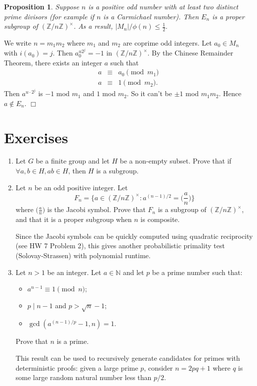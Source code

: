 \documentclass{article}
\def\Z{{\mathbb Z}}
\def\N{{\mathbb N}}
\def\Z{{\mathbb Z}}
\newtheorem{proposition}[subsection]{Proposition}
\newenvironment{proof}{\noindent {\bf Proof:}}{$\Box$ \vspace{2 ex}}
\renewcommand{\lg}[2]{\Big(\frac{#1}{#2}\Big)}
\begin{document}
\begin{proposition}
    Suppose $n$ is a positive odd number with at least two distinct prime divisors (for example if $n$ is a Carmichael number). Then $E_n$ is a proper subgroup of $(\Z/n\Z)^\times$. As a result, $|M_n|/\phi(n) \leq\frac12.$
\end{proposition}

\begin{proof}
    We write $n = m_1m_2$ where $m_1$ and $m_2$ are coprime odd integers. Let $a_0\in M_n$ with $i(a_0) = j$. Then $a_0^{u2^j} = -1$ in $(\Z/n\Z)^\times$. By the Chinese Remainder Theorem, there exists an integer $a$ such that \begin{eqnarray*}
        a&\equiv& a_0\pmod{m_1}\\
        a&\equiv&1\pmod{m_2}.
    \end{eqnarray*}
    Then $a^{u\cdot2^j}$ is $-1$ mod $m_1$ and $1$ mod $m_2$. So it can't be $\pm1$ mod $m_1m_2$. Hence $a\notin E_n$.
\end{proof}

\section*{Exercises}
\begin{enumerate}
    \item Let $G$ be a finite group and let $H$ be a non-empty subset. Prove that if $\forall a,b\in H, ab\in H$, then $H$ is a subgroup.
    \item Let $n$ be an odd positive integer. Let $$F_n = \{a\in(\Z/n\Z)^\times\colon a^{(n-1)/2} = \lg{a}{n}\}$$
    where $\lg{a}{n}$ is the Jacobi symbol. Prove that $F_n$ is a subgroup of $(\Z/n\Z)^\times$, and that it is a proper subgroup when $n$ is composite.

    Since the Jacobi symbols can be quickly computed using quadratic reciprocity (see HW 7 Problem 2), this gives another probabilistic primality test (Solovay-Strassen) with polynomial runtime.
    \item Let $n>1$ be an integer. Let $a\in\N$ and let $p$ be a prime number such that:
    \begin{itemize}
        \item $a^{n-1}\equiv 1\pmod{n}$;
        \item $p\mid n-1$ and $p>\sqrt{n}-1$;
        \item $\gcd(a^{(n-1)/p}-1, n) = 1$.
    \end{itemize}
    Prove that $n$ is a prime.

    This result can be used to recursively generate candidates for primes with deterministic proofs: given a large prime $p$, consider $n = 2pq + 1$ where $q$ is some large random natural number less than $p/2$.
\end{enumerate}
\end{document}
